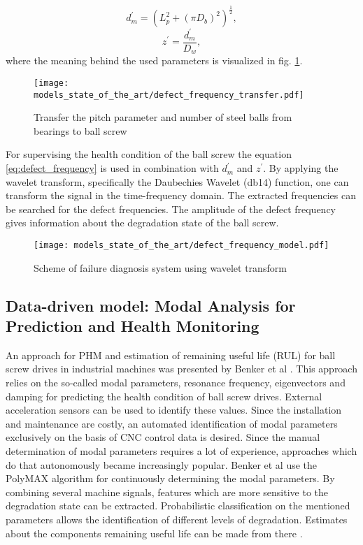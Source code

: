 \begin{equation}
    d_{m}^{'} = (L_{p}^{2}+(\pi D_{b})^{2})^{\frac{1}{2}},
\end{equation}
\begin{equation}
    z^{'} = \frac{d_{m}^{'}}{D_{w}},
\end{equation}
where the meaning behind the used parameters is visualized in fig. \ref{fig:defect_frequency_transfer}. 

\begin{figure}[H]
  \centering
  \texttt{[image: models\_state\_of\_the\_art/defect\_frequency\_transfer.pdf]}
  \caption{Transfer the pitch parameter and number of steel balls from bearings to ball screw \cite{Lee2015}}
  \label{fig:defect_frequency_transfer}
\end{figure}

For supervising the health condition of the ball screw the equation \ref{eq:defect_frequency} is used in combination with $d_{m}^{'}$ and $z^{'}$. By applying the wavelet transform, specifically the Daubechies Wavelet (db14) function, one can transform the signal in the time-frequency domain. The extracted frequencies can be searched for the defect frequencies. The amplitude of the defect frequency gives information about the degradation state of the ball screw.

\begin{figure}[H]
  \centering
  \texttt{[image: models\_state\_of\_the\_art/defect\_frequency\_model.pdf]}
  \caption{Scheme of failure diagnosis system using wavelet transform \cite{Lee2015}}
  \label{fig:defect_frequency_model}
\end{figure}



\subsection{Data-driven model: Modal Analysis for Prediction and Health Monitoring}
An approach for PHM and estimation of remaining useful life (RUL) for ball screw drives in industrial machines was presented by Benker et al . This approach relies on the so-called modal parameters, resonance frequency, eigenvectors and damping for predicting the health condition of ball screw drives. External acceleration sensors can be used to identify these values. Since the installation and maintenance are costly, an automated identification of modal parameters exclusively on the basis of CNC control data is desired. Since the manual determination of modal parameters requires a lot of experience, approaches which do that autonomously became increasingly popular. Benker et al use the PolyMAX algorithm  for continuously determining the modal parameters. By combining several machine signals, features which are more sensitive to the degradation state can be extracted. Probabilistic classification on the mentioned parameters allows the identification of different levels of degradation. Estimates about the components remaining useful life can be made from there \cite{Benker2020}.



